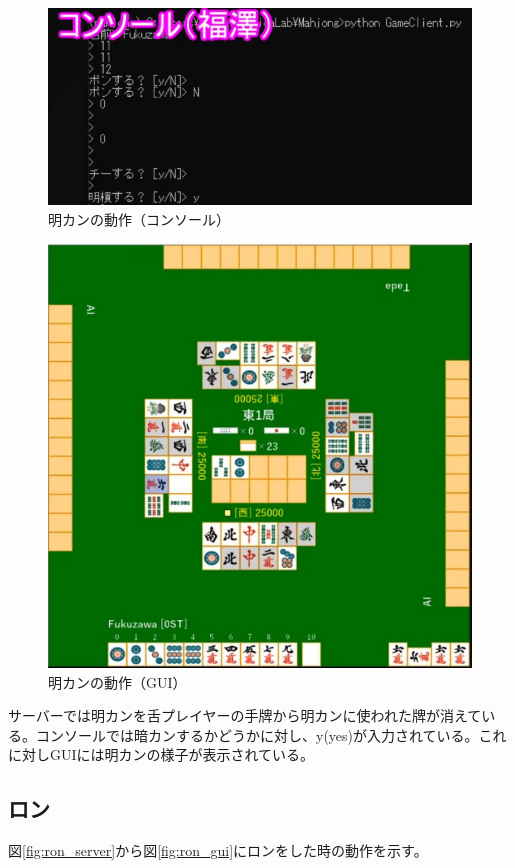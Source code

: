 \documentclass[a4j,titlepage]{jsarticle}
\begin{document}
\begin{figure}[htbp]
  \centering
  \includegraphics[width = 0.8\linewidth]{images/minkan_console.png}
  \caption{明カンの動作（コンソール）}
  \label{fig:minkan_console}
\end{figure}

\begin{figure}[htbp]
  \centering
  \includegraphics[width = 0.8\linewidth]{images/minkan_gui.png}
  \caption{明カンの動作（GUI）}
  \label{fig:minkan_gui}
\end{figure}

サーバーでは明カンを舌プレイヤーの手牌から明カンに使われた牌が消えている。コンソールでは暗カンするかどうかに対し、y(yes)が入力されている。これに対しGUIには明カンの様子が表示されている。

\subsection{ロン}
図\ref{fig:ron_server}から図\ref{fig:ron_gui}にロンをした時の動作を示す。
\end{document}
